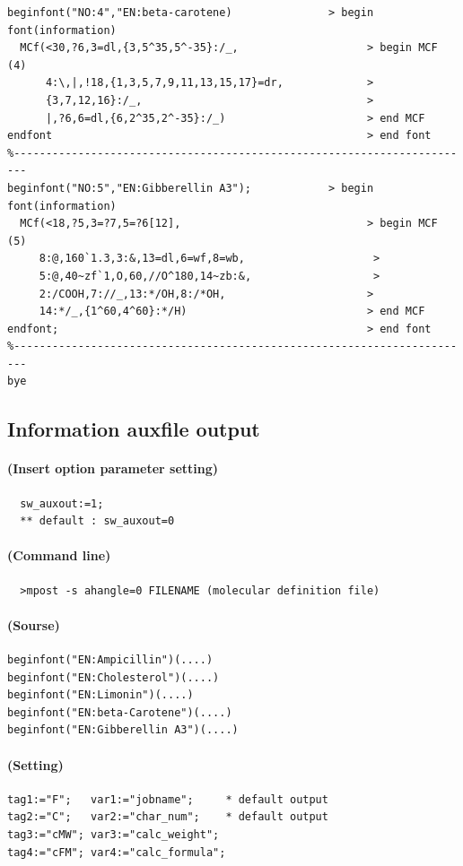\documentclass[a4paper]{article}
\begin{document}
\begin{verbatim}
beginfont("NO:4","EN:beta-carotene)               > begin font(information)
  MCf(<30,?6,3=dl,{3,5^35,5^-35}:/_,                    > begin MCF (4)
      4:\,|,!18,{1,3,5,7,9,11,13,15,17}=dr,             >
      {3,7,12,16}:/_,                                   >
      |,?6,6=dl,{6,2^35,2^-35}:/_)                      > end MCF
endfont                                                 > end font
%------------------------------------------------------------------------
beginfont("NO:5","EN:Gibberellin A3");            > begin font(information)
  MCf(<18,?5,3=?7,5=?6[12],                             > begin MCF (5)
     8:@,160`1.3,3:&,13=dl,6=wf,8=wb,                    >
     5:@,40~zf`1,O,60,//O^180,14~zb:&,                   >
     2:/COOH,7://_,13:*/OH,8:/*OH,                      >
     14:*/_,{1^60,4^60}:*/H)                            > end MCF
endfont;                                                > end font
%------------------------------------------------------------------------
bye
\end{verbatim}
\noindent%
\newpage
\subsection{Information auxfile output}
\paragraph{(Insert option parameter setting)}
\begin{verbatim}
  sw_auxout:=1;
  ** default : sw_auxout=0
\end{verbatim}
\paragraph{(Command line)}
\begin{verbatim}
  >mpost -s ahangle=0 FILENAME (molecular definition file)
\end{verbatim}
\paragraph{(Sourse)}
\begin{verbatim}
beginfont("EN:Ampicillin")(....)
beginfont("EN:Cholesterol")(....)
beginfont("EN:Limonin")(....)
beginfont("EN:beta-Carotene")(....)
beginfont("EN:Gibberellin A3")(....)
\end{verbatim}
\paragraph{(Setting)}
\begin{verbatim}
tag1:="F";   var1:="jobname";     * default output
tag2:="C";   var2:="char_num";    * default output
tag3:="cMW"; var3:="calc_weight";
tag4:="cFM"; var4:="calc_formula";
\end{verbatim}
\end{document}
